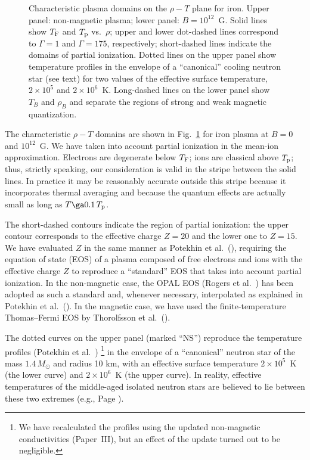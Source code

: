 \documentclass{aa}
\begin{document}
\begin{figure}
\begin{center}
\leavevmode
\epsfysize=130mm
\end{center}
\caption[]{Characteristic plasma domains on the $\rho-T$ plane for iron.
Upper panel: non-magnetic plasma; lower panel: $B=10^{12}$~G.
Solid lines show $T_{\rm F}$ and $T_{\rm p}$ vs.\ $\rho$;
upper and lower dot-dashed lines correspond to $\Gamma=1$ and $\Gamma=175$,
respectively;
short-dashed lines indicate the domains of partial ionization.
Dotted lines on the upper panel show temperature profiles
in the envelope of a ``canonical'' cooling
neutron star (see text) for two values of
the effective surface temperature,
$2\times10^5$ and $2\times10^6$~K.
Long-dashed lines on the lower panel show $T_B$ and $\rho_B$
and separate the regions
of strong and weak magnetic quantization.
}
\label{fig-domains}
\end{figure}

The characteristic $\rho-T$ domains are shown in Fig.~\ref{fig-domains}
for iron plasma at $B=0$ and $10^{12}$~G.
We have taken into account partial ionization in the mean-ion approximation.
Electrons are degenerate below $T_{\rm F}$;
ions are classical above $T_{\rm p}$;
thus, strictly speaking, our consideration is valid
in the stripe between the solid lines.
In practice it may be reasonably accurate
outside this stripe
because it incorporates thermal averaging
and because the quantum effects are
actually small as long as $T\ga 0.1\,T_{\rm p}$.

The short-dashed contours indicate the region of partial ionization:
the upper contour corresponds to the effective charge $Z=20$
and the lower one to $Z=15$.
We have evaluated $Z$ in the same
manner as Potekhin et al.\ (\cite{pcy97}),
requiring the equation of state (EOS)
of a plasma composed of free electrons and ions
with the effective charge $Z$
to reproduce a ``standard'' EOS
that takes into account partial ionization.
In the non-magnetic case, the OPAL EOS (Rogers et al.\ \cite{OPAL_EOS})
has been adopted as such a standard and,
whenever necessary,
interpolated as explained in Potekhin et al.\ (\cite{pcy97}).
In the magnetic case,
we have used the finite-temperature
Thomas--Fermi EOS by Thorolfsson et al.\ (\cite{Thorolf}).

The dotted curves on the upper panel (marked ``NS'')
reproduce the temperature profiles (Potekhin et al.\ \cite{pcy97})%
\footnote{We have recalculated the profiles using the
updated non-magnetic conductivities (Paper~III), but an effect of the
update turned out to be negligible.}
in the envelope of a ``canonical'' neutron star of the mass
$1.4\,M_\odot$ and radius 10 km,
with an effective surface temperature $2\times10^5$~K
(the lower curve) and $2\times10^6$~K (the upper curve).
In reality, effective temperatures of the middle-aged isolated
neutron stars are believed to lie between these two extremes
(e.g., Page \cite{page98}).
\end{document}
